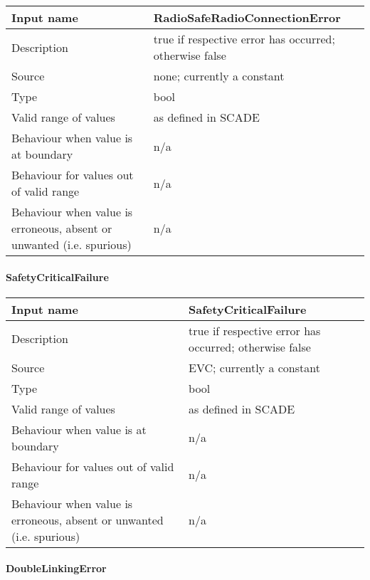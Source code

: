 \begin{longtable}{p{}p{}}
\toprule
Input name				& RadioSafeRadioConnectionError \\
\midrule
Description				& true if respective error has occurred; otherwise false \\
\midrule
Source					& none; currently a constant \\ 
\midrule
Type					& bool \\
\midrule
Valid range of values	& as defined in SCADE \\
\midrule
Behaviour when value is at boundary	& n/a \\
\midrule
Behaviour for values out of valid range	& n/a \\
\midrule
Behaviour when value is erroneous, absent or unwanted (i.e. spurious) & n/a \\
\bottomrule
\end{longtable}

\paragraph{SafetyCriticalFailure}

\begin{longtable}{p{}p{}}
\toprule
Input name				& SafetyCriticalFailure \\
\midrule
Description				& true if respective error has occurred; otherwise false \\
\midrule
Source					& EVC; currently a constant \\ 
\midrule
Type					& bool \\
\midrule
Valid range of values	& as defined in SCADE \\
\midrule
Behaviour when value is at boundary	& n/a \\
\midrule
Behaviour for values out of valid range	& n/a \\
\midrule
Behaviour when value is erroneous, absent or unwanted (i.e. spurious) & n/a \\
\bottomrule
\end{longtable}

\paragraph{DoubleLinkingError}

